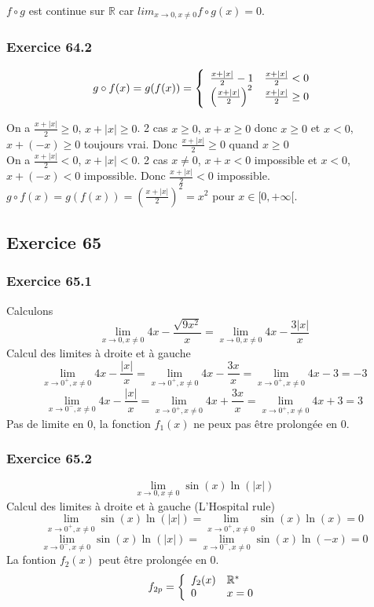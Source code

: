 \documentclass[]{book}
\theoremstyle{definition}
\newcommand{\bb}[1]{\mathbb{#1}}
\newcommand{\R}{\bb{R}}
\begin{document}
$f \circ g$ est continue sur $\R$ car $lim_{x \to 0, x \neq 0} f \circ g(x) = 0$. 

\subsubsection*{Exercice 64.2}
$$g \circ f(x) = g(f(x)) = 
\left\{ 
\begin{array}{l l}
\frac{x+|x|}{2}-1 & \frac{x+|x|}{2} < 0\\
\left(\frac{x+|x|}{2}\right)^2 & \frac{x+|x|}{2} \geq 0\\
\end{array}
\right.
$$

On a $\frac{x+|x|}{2} \geq 0$, $x+|x| \geq 0$. 2 cas $x \geq 0$, $x+x \geq 0$ donc $x \geq 0$ et $x < 0$, $x+(-x) \geq 0$ toujours vrai. Donc $\frac{x+|x|}{2} \geq 0$ quand $x \geq 0$\\

On a $\frac{x+|x|}{2} < 0$, $x+|x| < 0$. 2 cas $x \neq 0$, $x+x < 0$ impossible et $x < 0$, $x+(-x) < 0$ impossible. Donc $\frac{x+|x|}{2} < 0$ impossible.\\
$g \circ f(x) = g(f(x)) = \left(\frac{x+|x|}{2}\right)^2 = x^2$ pour $x \in [0,+\infty[$.


\subsection*{Exercice 65}
\subsubsection*{Exercice 65.1}
Calculons
$$\lim_{x\to0, x\neq0}4x-\frac{\sqrt{9x^2}}{x} = \lim_{x\to0, x\neq0}4x-\frac{3|x|}{x}$$
Calcul des limites \`a droite et \`a gauche
$$\lim_{x\to0^{+}, x\neq0}4x-\frac{|x|}{x} = \lim_{x\to0^{+}, x\neq0}4x-\frac{3x}{x} = \lim_{x\to0^{+}, x\neq0}4x-3 = -3$$
$$\lim_{x\to0^{-}, x\neq0}4x-\frac{|x|}{x} = \lim_{x\to0^{+}, x\neq0}4x+\frac{3x}{x} = \lim_{x\to0^{+}, x\neq0}4x+3 = 3$$
Pas de limite en $0$, la fonction $f_1(x)$ ne peux pas \^etre prolong\'ee en 0.

\subsubsection*{Exercice 65.2}
$$\lim_{x\to0, x\neq0}\sin(x)\ln(|x|)$$
Calcul des limites \`a droite et \`a gauche (L'Hospital rule)
$$\lim_{x\to0^{+}, x\neq0}\sin(x)\ln(|x|) = \lim_{x\to0^{+}, x\neq0}\sin(x)\ln(x) = 0$$
$$\lim_{x\to0^{-}, x\neq0}\sin(x)\ln(|x|) = \lim_{x\to0^{-}, x\neq0}\sin(x)\ln(-x) = 0$$
La fontion $f_2(x)$ peut \^etre prolong\'ee en 0.
$$
f_{2p} =
\left\{ 
\begin{array}{l l}
f_2(x) & \R^{*}\\
0 & x =0\\
\end{array}
\right.
$$
\end{document}
